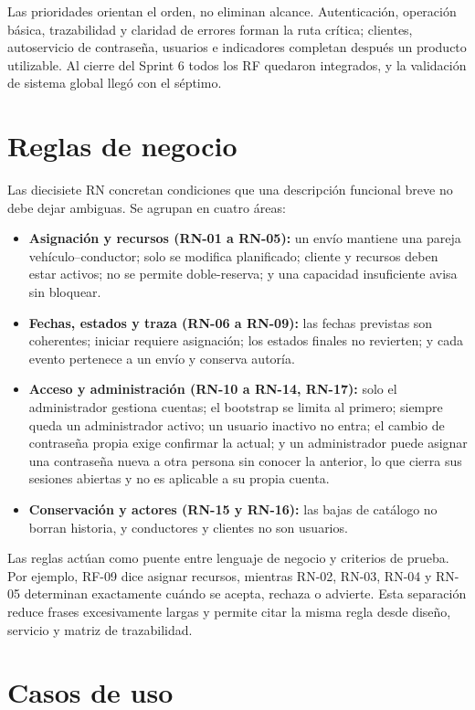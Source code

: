 Las prioridades orientan el orden, no eliminan alcance. Autenticación, operación básica, trazabilidad y claridad de errores forman la ruta crítica; clientes, autoservicio de contraseña, usuarios e indicadores completan después un producto utilizable. Al cierre del Sprint 6 todos los RF quedaron integrados, y la validación de sistema global llegó con el séptimo.

\section{Reglas de negocio}

Las diecisiete RN concretan condiciones que una descripción funcional breve no debe dejar ambiguas. Se agrupan en cuatro áreas:

\begin{itemize}
  \item \textbf{Asignación y recursos (RN-01 a RN-05):} un envío mantiene una pareja vehículo--conductor; solo se modifica planificado; cliente y recursos deben estar activos; no se permite \gls{doble-reserva}; y una capacidad insuficiente avisa sin bloquear.
  \item \textbf{Fechas, estados y traza (RN-06 a RN-09):} las fechas previstas son coherentes; iniciar requiere asignación; los estados finales no revierten; y cada evento pertenece a un envío y conserva autoría.
  \item \textbf{Acceso y administración (RN-10 a RN-14, RN-17):} solo el administrador gestiona cuentas; el bootstrap se limita al primero; siempre queda un administrador activo; un usuario inactivo no entra; el cambio de contraseña propia exige confirmar la actual; y un administrador puede asignar una contraseña nueva a otra persona sin conocer la anterior, lo que cierra sus sesiones abiertas y no es aplicable a su propia cuenta.
  \item \textbf{Conservación y actores (RN-15 y RN-16):} las bajas de catálogo no borran historia, y conductores y clientes no son usuarios.
\end{itemize}

Las reglas actúan como puente entre lenguaje de negocio y criterios de prueba. Por ejemplo, RF-09 dice asignar recursos, mientras RN-02, RN-03, RN-04 y RN-05 determinan exactamente cuándo se acepta, rechaza o advierte. Esta separación reduce frases excesivamente largas y permite citar la misma regla desde diseño, servicio y matriz de trazabilidad.

\section{Casos de uso}

